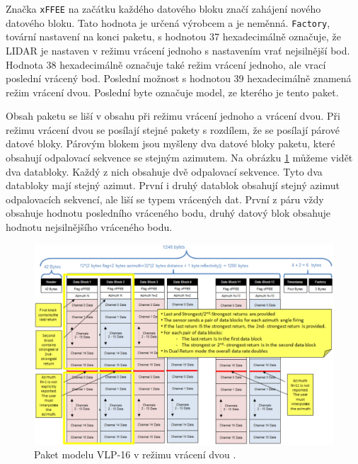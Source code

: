 \documentclass[czech,bachelor,dept420,male,cpdeclaration]{diploma}
\begin{document}
Značka \texttt{xFFEE} na začátku každého datového bloku značí zahájení nového datového bloku. Tato hodnota je určená výrobcem a je neměnná. \texttt{Factory}, tovární nastavení na konci paketu, s hodnotou 37 hexadecimálně označuje, že LIDAR je nastaven v režimu vrácení jednoho s nastavením vrať nejsilnější bod. Hodnota \num{38} hexadecimálně označuje také režim vrácení jednoho, ale vrací poslední vrácený bod. Poslední možnost s hodnotou \num{39} hexadecimálně znamená režim vrácení dvou. Poslední byte označuje model, ze kterého je tento paket.

Obsah paketu se liší v obsahu při režimu vrácení jednoho a vrácení dvou. Při režimu vrácení dvou se posílají stejné pakety s rozdílem, že se posílají párové datové bloky. Párovým blokem jsou myšleny dva datové bloky paketu, které obsahují odpalovací sekvence se stejným azimutem. Na obrázku \ref{fig:packet2} můžeme vidět dva databloky. Každý z nich obsahuje dvě odpalovací sekvence. Tyto dva databloky mají stejný azimut. První i druhý datablok obsahují stejný azimut odpalovacích sekvencí, ale liší se typem vrácených dat. První z páru vždy obsahuje hodnotu posledního vráceného bodu, druhý datový blok obsahuje hodnotu nejsilnějšího vráceného bodu. 
 
\begin{figure}[H]
\includegraphics[width=\linewidth]{Figures/paket-dual.png}
\caption{ Paket modelu VLP-16 v režimu vrácení dvou \cite{packet}. }
\label{fig:packet2}
\end{figure}

\end{document}
